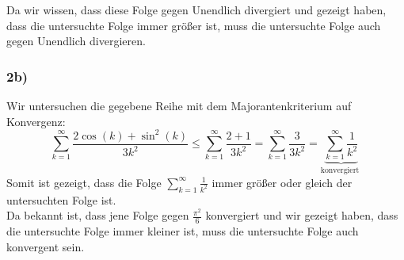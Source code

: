 Da wir wissen, dass diese Folge gegen Unendlich divergiert und gezeigt haben, dass die untersuchte Folge immer größer ist, muss die untersuchte Folge auch gegen Unendlich divergieren. 


\subsubsection{2b)}

Wir untersuchen die gegebene Reihe mit dem Majorantenkriterium auf Konvergenz:
\begin{equation*}
  \sum\limits _{k=1}^{\infty }\frac{2\cos( k) +\sin^{2}( k)}{3k^{2}} \leq \sum\limits _{k=1}^{\infty }\frac{2+1}{3k^{2}} =\sum\limits _{k=1}^{\infty }\frac{3}{3k^{2}} =\underbrace{\sum\limits _{k=1}^{\infty }\frac{1}{k^{2}}}_{\text{konvergiert }}
\end{equation*}
Somit ist gezeigt, dass die Folge $\displaystyle \sum\nolimits _{k=1}^{\infty }\frac{1}{k^{2}}$ immer größer oder gleich der untersuchten Folge ist.\\

Da bekannt ist, dass jene Folge gegen $\displaystyle \frac{\pi ^{2}}{6}$ konvergiert und wir gezeigt haben, dass die untersuchte Folge immer kleiner ist, muss die untersuchte Folge auch konvergent sein.